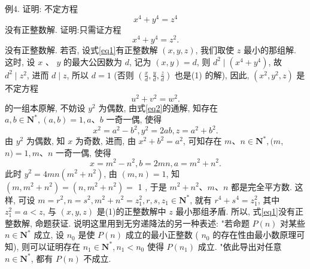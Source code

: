 例4. 证明: 不定方程
$$
x^4+y^4=z^4
$$
没有正整数解.
证明:只需证方程
$$
x^4+y^4=z^2 . \label{eq1}
$$
没有正整数解.
若否, 设式\ref{eq1}有正整数解 $(x, y, z)$, 我们取使 $z$ 最小的那组解.
这时, 设 $x$ 、 $y$ 的最大公因数为 $d$, 记为 $(x, y)=d$, 则 $d^2 \mid\left(x^4+y^4\right)$, 故 $d^2 \mid z^2$, 进而 $d \mid z$, 所以 $d=1$ (否则 $\left(\frac{x}{d}, \frac{y}{d}, \frac{z}{d}\right)$ 也是(1) 的解), 因此, $\left(x^2, y^2, z\right)$ 是不定方程
$$
u^2+v^2=w^2 . \label{eq2}
$$
的一组本原解, 不妨设 $y^2$ 为偶数, 由式\ref{eq2}的通解, 知存在 $a, b \in \mathbf{N}^*,(a, b)= 1, a 、 b$ 一奇一偶, 使得
$$
x^2=a^2-b^2, y^2=2 a b, z=a^2+b^2 .
$$
由 $y^2$ 为偶数, 知 $x$ 为奇数, 进而, 由 $x^2+b^2=a^2$, 可知存在 $m 、 n \in \mathbf{N}^*,(m$, $n)=1, m 、 n$ 一奇一偶, 使得
$$
x=m^2-n^2, b=2 m n, a=m^2+n^2 .
$$
此时 $y^2=4 m n\left(m^2+n^2\right)$, 由 $(m, n)=1$, 知 $\left(m, m^2+n^2\right)=\left(n, m^2+n^2\right)=$ 1 , 于是 $m^2+n^2 、 m 、 n$ 都是完全平方数.
这样, 可设 $m=r^2, n=s^2, m^2+n^2= z_1^2, r, s, z_1 \in \mathbf{N}^*$, 就有 $r^4+s^4=z_1^2$, 其中 $z_1^2=a<z$, 与 $(x, y, z)$ 是(1)的正整数解中 $z$ 最小那组矛盾.
所以, 式\ref{eq1}没有正整数解, 命题获证.
说明这里用到无穷递降法的另一种表述: "若命题 $P(n)$ 对某些 $n \in \mathbf{N}^*$ 成立, 设 $n_0$ 是使 $P(n)$ 成立的最小正整数 ( $n_0$ 的存在性由最小数原理可知), 则可以证明存在 $n_1 \in \mathbf{N}^*, n_1<n_0$ 使得 $P\left(n_1\right)$ 成立.
"依此导出对任意 $n \in \mathbf{N}^*$, 都有 $P(n)$ 不成立.



